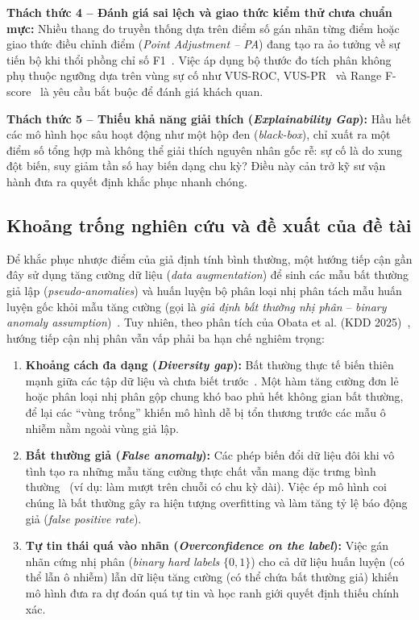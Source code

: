 \documentclass[sigconf,nonacm]{acmart}
\begin{document}
\textbf{Thách thức 4 -- Đánh giá sai lệch và giao thức kiểm thử chưa chuẩn mực:} Nhiều thang đo truyền thống dựa trên điểm số gán nhãn từng điểm hoặc giao thức điều chỉnh điểm (\textit{Point Adjustment -- PA}) đang tạo ra ảo tưởng về sự tiến bộ khi thổi phồng chỉ số F1~\cite{kim2022, wu2021, sarfraz2024}. Việc áp dụng bộ thước đo tích phân không phụ thuộc ngưỡng dựa trên vùng sự cố như VUS-ROC, VUS-PR~\cite{paparrizos2022} và Range F-score~\cite{tatbul2018} là yêu cầu bắt buộc để đánh giá khách quan.

\textbf{Thách thức 5 -- Thiếu khả năng giải thích (\textit{Explainability Gap}):} Hầu hết các mô hình học sâu hoạt động như một hộp đen (\textit{black-box}), chỉ xuất ra một điểm số tổng hợp mà không thể giải thích nguyên nhân gốc rễ: sự cố là do xung đột biến, suy giảm tần số hay biến dạng chu kỳ? Điều này cản trở kỹ sư vận hành đưa ra quyết định khắc phục nhanh chóng.

\subsection{Khoảng trống nghiên cứu và đề xuất của đề tài}

Để khắc phục nhược điểm của giả định tính bình thường, một hướng tiếp cận gần đây sử dụng tăng cường dữ liệu (\textit{data augmentation}) để sinh các mẫu bất thường giả lập (\textit{pseudo-anomalies}) và huấn luyện bộ phân loại nhị phân tách mẫu huấn luyện gốc khỏi mẫu tăng cường (gọi là \textit{giả định bất thường nhị phân} -- \textit{binary anomaly assumption})~\cite{hendrycks2019, li2021, wang2024}. Tuy nhiên, theo phân tích của Obata et al. (KDD 2025)~\cite{obata2025}, hướng tiếp cận nhị phân vẫn vấp phải ba hạn chế nghiêm trọng:
\begin{enumerate}[leftmargin=*, itemsep=1pt, parsep=0pt]
    \item \textbf{Khoảng cách đa dạng (\textit{Diversity gap}):} Bất thường thực tế biến thiên mạnh giữa các tập dữ liệu và chưa biết trước~\cite{yoo2023}. Một hàm tăng cường đơn lẻ hoặc phân loại nhị phân gộp chung khó bao phủ hết không gian bất thường, để lại các ``vùng trống'' khiến mô hình dễ bị tổn thương trước các mẫu ô nhiễm nằm ngoài vùng giả lập.
    \item \textbf{Bất thường giả (\textit{False anomaly}):} Các phép biến đổi dữ liệu đôi khi vô tình tạo ra những mẫu tăng cường thực chất vẫn mang đặc trưng bình thường~\cite{yoon2022} (ví dụ: làm mượt trên chuỗi có chu kỳ dài). Việc ép mô hình coi chúng là bất thường gây ra hiện tượng overfitting và làm tăng tỷ lệ báo động giả (\textit{false positive rate}).
    \item \textbf{Tự tin thái quá vào nhãn (\textit{Overconfidence on the label}):} Việc gán nhãn cứng nhị phân (\textit{binary hard labels} $\{0, 1\}$) cho cả dữ liệu huấn luyện (có thể lẫn ô nhiễm) lẫn dữ liệu tăng cường (có thể chứa bất thường giả) khiến mô hình đưa ra dự đoán quá tự tin và học ranh giới quyết định thiếu chính xác.
\end{enumerate}
\end{document}
